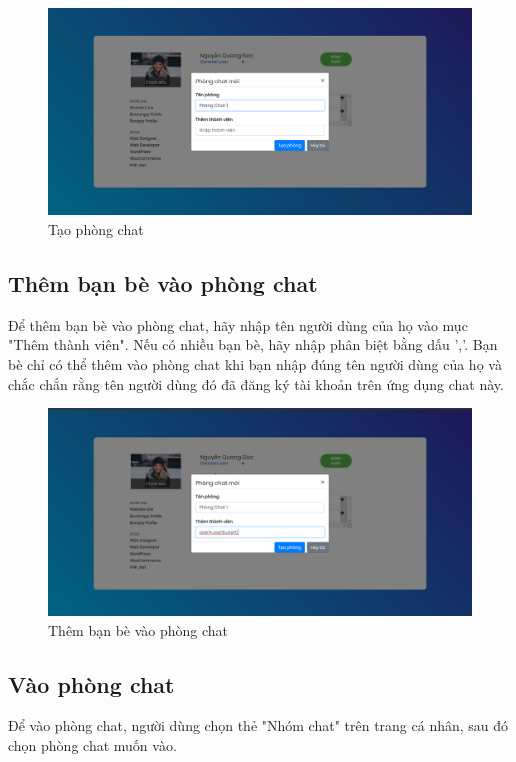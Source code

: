 \documentclass[a4paper]{article}
\begin{document}
	\begin{figure}[H]
		\centering
		\includegraphics[scale=0.36]{create_room.png}
		\caption{Tạo phòng chat}
		\label{F:create_room}
	\end{figure}
	
	\subsection{Thêm bạn bè vào phòng chat}
	Để thêm bạn bè vào phòng chat, hãy nhập tên người dùng của họ vào mục "Thêm thành viên". Nếu có nhiều bạn bè, hãy nhập phân biệt bằng dấu ','.\linebreak
	Bạn bè chỉ có thể thêm vào phòng chat khi bạn nhập đúng tên người dùng của họ và chắc chắn rằng tên người dùng đó đã đăng ký tài khoản trên ứng dụng chat này.
	
	\begin{figure}[H]
		\centering
		\includegraphics[scale=0.36]{add_user.png}
		\caption{Thêm bạn bè vào phòng chat}
		\label{F:add_user}
	\end{figure}
	
	\subsection{Vào phòng chat}
	Để vào phòng chat, người dùng chọn thẻ "Nhóm chat" trên trang cá nhân, sau đó chọn phòng chat muốn vào.
	
\end{document}
